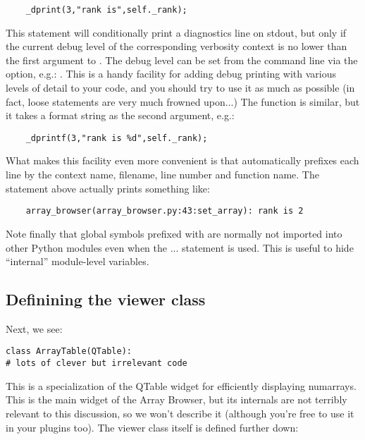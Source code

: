 \documentclass[12pt,twoside]{book}
\begin{document}
\begin{verbatim} 
    _dprint(3,"rank is",self._rank);
\end{verbatim}

  This statement will conditionally print a diagnostics line on stdout, but only
  if the current debug level of the corresponding verbosity context is no lower 
  than the first argument to . The debug level can be set from the
  command line via the  option, e.g.: . This
  is a handy facility for adding debug printing with various levels of detail to
  your code, and you should try to use it as much as possible (in fact, loose
   statements are very much frowned upon...) The 
  function is similar, but it takes a format string as the second argument,
  e.g.:

\begin{verbatim}  
    _dprintf(3,"rank is %d",self._rank);
\end{verbatim}

  What makes this facility even more convenient is that 
  automatically prefixes each line by the context name, filename, line number
  and function name. The statement above actually prints something like:

\begin{verbatim}  
    array_browser(array_browser.py:43:set_array): rank is 2
\end{verbatim}

  Note finally that global symbols prefixed with  are normally not
  imported into other Python modules even when the  ... 
  statement is used. This is useful to hide ``internal'' module-level
  variables.

\subsection{Definining the viewer class} 

  Next, we see:

\begin{verbatim}  
class ArrayTable(QTable):
# lots of clever but irrelevant code
\end{verbatim}

  This is a specialization of the QTable widget for efficiently displaying
  numarrays. This is the main widget of the Array Browser, but its internals are
  not terribly relevant to this discussion, so we won't describe it (although
  you're free to use it in your plugins too). The viewer class itself is defined
  further down:
\end{document}
